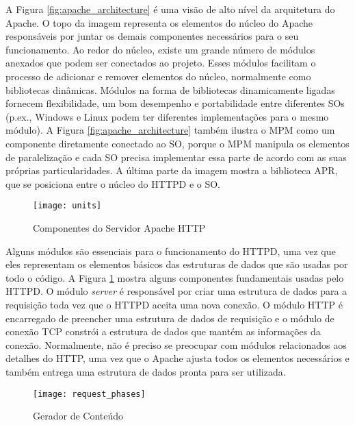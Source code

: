 A Figura \ref{fig:apache_architecture} é uma visão de alto nível da arquitetura
do Apache. O topo da imagem representa os elementos do núcleo do Apache
responsáveis por juntar os demais componentes necessários para o seu
funcionamento. Ao redor do núcleo, existe um grande número de módulos anexados
que podem ser conectados ao projeto. Esses módulos facilitam o processo de
adicionar e remover elementos do núcleo, normalmente como bibliotecas
dinâmicas. Módulos na forma de bibliotecas dinamicamente ligadas fornecem
flexibilidade, um bom desempenho e portabilidade entre diferentes SOs (p.ex.,
Windows e Linux podem ter diferentes implementações para o mesmo módulo). A
Figura \ref{fig:apache_architecture} também ilustra o MPM como um componente
diretamente conectado ao SO, porque o MPM manipula os elementos de
paralelização e cada SO precisa implementar essa parte de acordo com as suas
próprias particularidades. A última parte da imagem mostra a biblioteca APR,
que se posiciona entre o núcleo do HTTPD e o SO.

\begin{figure}[!h]
  \centering
  \texttt{[image: units]} 
  \caption{Componentes do Servidor Apache HTTP}
  \label{fig:units} 
\end{figure}

Alguns módulos são essenciais para o funcionamento do HTTPD, uma vez que eles
representam os elementos básicos das estruturas de dados que são usadas por
todo o código. A Figura \ref{fig:units} mostra alguns componentes fundamentais
usadas pelo HTTPD. O módulo \emph{server} é responsável por criar uma estrutura de
dados para a requisição toda vez que o HTTPD aceita uma nova conexão. O módulo
HTTP é encarregado de preencher uma estrutura de dados de requisição e o
módulo de conexão TCP constrói a estrutura de dados que mantém as informações
da conexão. Normalmente, não é preciso se preocupar com módulos relacionados
aos detalhes do HTTP, uma vez que o Apache ajusta todos os elementos necessários
e também entrega uma estrutura de dados pronta para ser utilizada.

\begin{figure}[!h]
  \centering
  \texttt{[image: request\_phases]} 
	\caption[Gerador de Conteúdo]{Gerador de Conteúdo \citep{apache_module_book}}
  \label{fig:content_generator} 
\end{figure}

